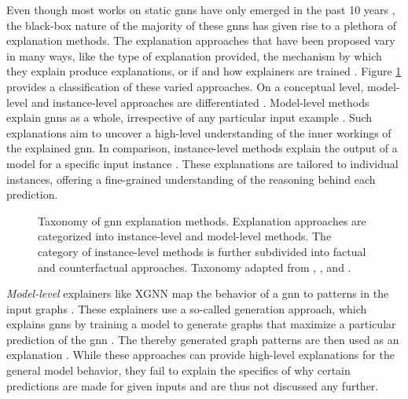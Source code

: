Even though most works on static \glspl{gnn} have only emerged in the past 10 years \cite{wu_comprehensive_2021}, the black-box nature of the majority of these \glspl{gnn} has given rise to a plethora of explanation methods. The explanation approaches that have been proposed vary in many ways, like the type of explanation provided, the mechanism by which they explain produce explanations, or if and how explainers are trained \cite{kakkad_survey_2023}. Figure \ref{f_taxonomy_explainers} provides a classification of these varied approaches. On a conceptual level, model-level and instance-level approaches are differentiated \cite{yuan_explainability_2020}. Model-level methods explain \glspl{gnn} as a whole, irrespective of any particular input example \cite{yuan_explainability_2020}. Such explanations aim to uncover a high-level understanding of the inner workings of the explained \gls{gnn}. In comparison, instance-level methods explain the output of a model for a specific input instance \cite{yuan_explainability_2020}. These explanations are tailored to individual instances, offering a fine-grained understanding of the reasoning behind each prediction.

\begin{figure}[ht]
    \centering
    
    \caption{Taxonomy of \gls{gnn} explanation methods. Explanation approaches are categorized into instance-level and model-level methods. The category of instance-level methods is further subdivided into factual and counterfactual approaches. Taxonomy adapted from \cite{yuan_explainability_2020}, \cite{prado-romero_survey_2023}, and \cite{kakkad_survey_2023}.}
    \label{f_taxonomy_explainers}

\end{figure}

\textit{Model-level} explainers like XGNN \cite{yuan_xgnn_2020} map the behavior of a \gls{gnn} to patterns in the input graphs \cite{yuan_explainability_2020}. These explainers use a so-called generation approach, which explains \glspl{gnn} by training a model to generate graphs that maximize a particular prediction of the \gls{gnn} \cite{yuan_explainability_2020, yuan_xgnn_2020}. The thereby generated graph patterns are then used as an explanation \cite{yuan_xgnn_2020}. While these approaches can provide high-level explanations for the general model behavior, they fail to explain the specifics of why certain predictions are made for given inputs and are thus not discussed any further.

\newpage

